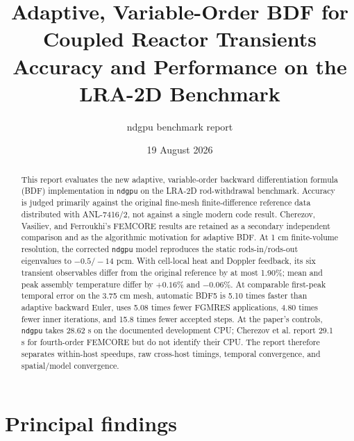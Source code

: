 \documentclass[10pt]{article}
\title{\textbf{Adaptive, Variable-Order BDF for Coupled Reactor Transients}\\
\large Accuracy and Performance on the LRA-2D Benchmark}
\author{ndgpu benchmark report}
\date{19 August 2026}
\newcommand{\ndgpu}{\texttt{ndgpu}}
\begin{document}
\maketitle

\begin{abstract}
This report evaluates the new adaptive, variable-order backward differentiation
formula (BDF) implementation in \ndgpu{} on the LRA-2D rod-withdrawal
benchmark. Accuracy is judged primarily against the original fine-mesh
finite-difference reference data distributed with ANL-7416/2, not against a
single modern code result. Cherezov, Vasiliev, and Ferroukhi's FEMCORE results
are retained as a secondary independent comparison and as the algorithmic
motivation for adaptive BDF. At 1 cm finite-volume resolution, the corrected
\ndgpu{} model reproduces the static rods-in/rods-out eigenvalues to
$-0.5/-14$ pcm. With cell-local heat and Doppler feedback, its six transient
observables differ from the original reference by at most 1.90\%; mean and peak
assembly temperature differ by $+0.16\%$ and $-0.06\%$. At comparable
first-peak temporal error on the 3.75 cm mesh, automatic BDF5 is 5.10 times
faster than adaptive backward Euler, uses 5.08 times fewer FGMRES applications,
4.80 times fewer inner iterations, and 15.8 times fewer accepted steps. At the
paper's controls, \ndgpu{} takes 28.62 s on the documented development CPU;
Cherezov et al. report 29.1 s for fourth-order FEMCORE but do not identify
their CPU. The report therefore separates within-host speedups, raw cross-host
timings, temporal convergence, and spatial/model convergence.
\end{abstract}

\section*{Principal findings}
\end{document}
